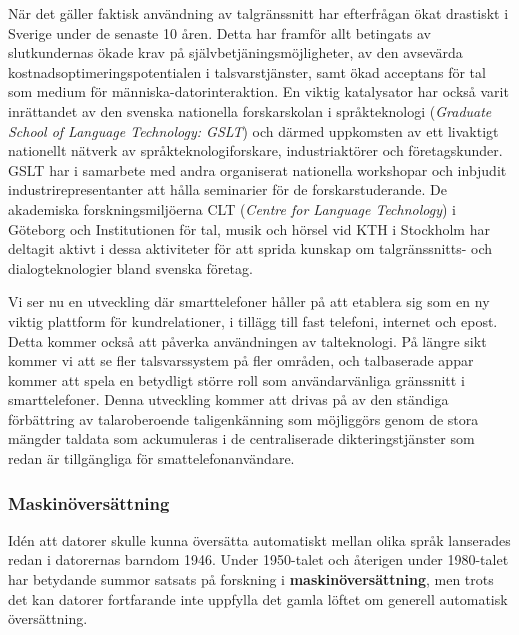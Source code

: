 \begin{multicols}{2}
När det gäller faktisk användning av talgränssnitt har efterfrågan
ökat drastiskt i Sverige under de senaste 10 åren. Detta har framför
allt betingats av slutkundernas ökade krav på
själv\-be\-tjän\-ings\-möj\-lig\-het\-er, av den avsevärda
kost\-nads\-opti\-mer\-ings\-poten\-tial\-en i talsvarstjänster, samt
ökad acceptans för tal som medium för människa-datorinteraktion. En
viktig katalysator har också varit inrättandet av den svenska
nationella forskarskolan i språkteknologi (\emph{Graduate School of
  Language Technology: GSLT}) och därmed uppkomsten av ett livaktigt
nationellt nätverk av språkteknologiforskare, industriaktörer och
företagskunder. GSLT har i samarbete med andra organiserat nationella
work\-shop\-ar och inbjudit industrirepresentanter att hålla seminarier
för de forskarstuderande. De akademiska forskningsmiljöerna CLT
(\emph{Centre for Language Technology}) i Göteborg och Institutionen
för tal, musik och hörsel vid KTH i Stockholm har deltagit aktivt i
dessa aktiviteter för att sprida kunskap om talgränssnitts- och
dialogteknologier bland svenska företag.

Vi ser nu en utveckling där smarttelefoner håller på att etablera sig
som en ny viktig plattform för kundrelationer, i tillägg till fast
telefoni, internet och epost. Detta kommer också att påverka
användningen av talteknologi. På längre sikt kommer vi att se fler
talsvarssystem på fler områden, och talbaserade appar kommer att spela
en betydligt större roll som användarvänliga gränssnitt i
smarttelefoner. Denna utveckling kommer att drivas på av den ständiga
förbättring av talaroberoende taligenkänning som möjliggörs genom de
stora mängder taldata som ackumuleras i de centraliserade
dikteringstjänster som redan är tillgängliga för smattelefonanvändare.


\subsubsection{Maskin\-över\-sätt\-ning}

Idén att datorer skulle kunna översätta automatiskt mellan olika språk
lanserades redan i datorernas barndom 1946. Under 1950-talet och
återigen under 1980-talet har betydande summor satsats på forskning i
\textbf{maskinöversättning}, men trots det kan datorer fortfarande
inte uppfylla det gamla löftet om generell automatisk översättning.



\end{multicols}
